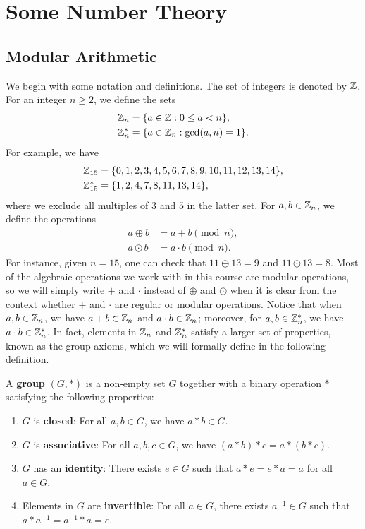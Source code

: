 \section{Some Number Theory}

\subsection{Modular Arithmetic}
We begin with some notation and definitions. The set of integers is denoted by $\mathbb{Z}$. For an 
integer $n \geq 2$, we define the sets 
\begin{align*}
    \mathbb{Z}_n &= \{a \in \mathbb{Z} : 0 \leq a < n\}, \\ \mathbb{Z}_n^* &= \{a \in \mathbb{Z}_n : \gcd(a, n) = 1\}. 
\end{align*}
For example, we have 
\begin{align*}
    \mathbb{Z}_{15} &= \{0, 1, 2, 3, 4, 5, 6, 7, 8, 9, 10, 11, 12, 13, 14\}, \\
    \mathbb{Z}_{15}^* &= \{1,2,4,7,8,11,13,14\},
\end{align*}
where we exclude all multiples of $3$ and $5$ in the latter set. 
For $a, b \in \mathbb{Z}_n$, we define the operations 
\begin{align*}
    a \oplus b &= a + b \pmod n, \\
    a \odot b &= a \cdot b \pmod n.
\end{align*}
For instance, given $n = 15$, one can check that $11 \oplus 13 = 9$ and $11 \odot 13 = 8$. 
Most of the algebraic operations we work with in this course are modular operations, so we will simply 
write $+$ and $\cdot$ instead of $\oplus$ and $\odot$ when it is clear from the context 
whether $+$ and $\cdot$ are regular or modular operations. 
Notice that when $a, b \in \mathbb{Z}_n$, we have $a + b \in \mathbb{Z}_n$ and $a \cdot b \in \mathbb{Z}_n$; moreover, 
for $a, b \in \mathbb{Z}_n^*$, we have $a \cdot b \in \mathbb{Z}_n^*$. In fact, elements in $\mathbb{Z}_n$ and 
$\mathbb{Z}_n^*$ satisfy a larger set of properties, known as the group axioms, which we will 
formally define in the following definition.

\begin{defn}
A {\bf group} $(G, *)$ is a non-empty set $G$ together with a binary operation $*$ satisfying the 
following properties:
\begin{enumerate}[(1)]
    \item $G$ is {\bf closed}: For all $a, b \in G$, we have $a * b \in G$. 
    \item $G$ is {\bf associative}: For all $a, b, c \in G$, we have $(a * b) * c = a * (b * c)$. 
    \item $G$ has an {\bf identity}: There exists $e \in G$ such that $a * e = e * a = a$ for all $a \in G$.
    \item Elements in $G$ are {\bf invertible}: For all $a \in G$, there exists $a^{-1} \in G$ 
    such that $a * a^{-1} = a^{-1} * a = e$. 
\end{enumerate}
\end{defn}

